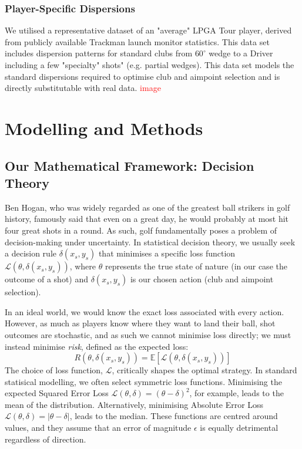 \documentclass[11pt, letterpaper]{article}
\begin{document}
\subsubsection{Player-Specific Dispersions}

We utilised a representative dataset of an "average" LPGA Tour player, derived from publicly available Trackman launch monitor statistics. This data set includes dispersion patterns for standard clubs from $60^\circ$ wedge to a Driver including a few "specialty" shots" (e.g. partial wedges). This data set models the standard dispersions required to optimise club and aimpoint selection and is directly substitutable with real data. \textcolor{red}{image}

\section{Modelling and Methods}

\subsection{Our Mathematical Framework: Decision Theory}

Ben Hogan, who was widely regarded as one of the greatest ball strikers in golf history, famously said that even on a great day, he would probably at most hit four great shots in a round. As such, golf fundamentally poses a problem of decision-making under uncertainty. In statistical decision theory, we usually seek a decision rule $\delta(x_s, y_s)$ that minimises a specific loss function $\mathcal{L}(\theta, \delta(x_s,y_s))$, where $\theta$ represents the true state of nature (in our case the outcome of a shot) and $\delta(x_s, y_s)$ is our chosen action (club and aimpoint selection).

In an ideal world, we would know the exact loss associated with every action. However, as much as players know where they want to land their ball, shot outcomes are stochastic, and as such we cannot minimise loss directly; we must instead minimise \textit{risk}, defined as the expected loss:
$$R(\theta, \delta(x_s, y_s)) = \mathbb{E}[\mathcal{L}(\theta, \delta(x_s,y_s))]$$
The choice of loss function, $\mathcal{L}$, critically shapes the optimal strategy. In standard statisical modelling, we often select symmetric loss functions. Minimising the expected Squared Error Loss $\mathcal{L}(\theta, \delta) = (\theta - \delta)^2 $, for example, leads to the mean of the distribution. Alternatively, minimising Absolute Error Loss $\mathcal{L}(\theta, \delta) = |\theta - \delta|$, leads to the median. These functions are centred around values, and they assume that an error of magnitude $\epsilon$ is equally detrimental regardless of direction.
\end{document}
